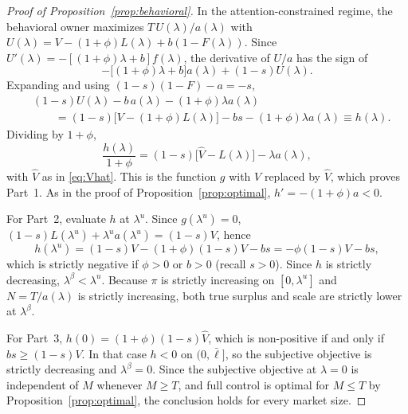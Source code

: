 \documentclass[11pt,a4paper]{article}
\theoremstyle{plain}
\newcommand{\lbar}{\bar{\ell}}
\begin{document}
\begin{proof}[Proof of Proposition~\ref{prop:behavioral}]
In the attention-constrained regime, the behavioral owner maximizes $T \, U(\lambda)/a(\lambda)$ with $U(\lambda) = V - (1 + \phi)L(\lambda) + b(1 - F(\lambda))$. Since $U'(\lambda) = -[(1+\phi)\lambda + b] f(\lambda)$, the derivative of $U/a$ has the sign of
\[
  -\big[(1+\phi)\lambda + b\big] a(\lambda) + (1 - s) U(\lambda).
\]
Expanding and using $(1-s)(1 - F) - a = -s$,
\begin{align*}
  &(1-s)U(\lambda) - b\,a(\lambda) - (1+\phi)\lambda a(\lambda) \\
  &\qquad = (1 - s)\big[V - (1+\phi)L(\lambda)\big] - b s - (1 + \phi) \lambda a(\lambda) \equiv h(\lambda).
\end{align*}
Dividing by $1 + \phi$,
\[
  \frac{h(\lambda)}{1+\phi} = (1 - s)\big[\hat V - L(\lambda)\big] - \lambda a(\lambda),
\]
with $\hat V$ as in \eqref{eq:Vhat}. This is the function $g$ with $V$ replaced by $\hat V$, which proves Part~1. As in the proof of Proposition~\ref{prop:optimal}, $h' = -(1+\phi)a < 0$.

For Part~2, evaluate $h$ at $\lambda^u$. Since $g(\lambda^u) = 0$, $(1-s)L(\lambda^u) + \lambda^u a(\lambda^u) = (1-s)V$, hence
\[
  h(\lambda^u) = (1-s)V - (1+\phi)(1-s)V - bs = -\phi(1-s)V - bs,
\]
which is strictly negative if $\phi > 0$ or $b > 0$ (recall $s > 0$). Since $h$ is strictly decreasing, $\lambda^\beta < \lambda^u$. Because $\pi$ is strictly increasing on $[0, \lambda^u]$ and $N = T/a(\lambda)$ is strictly increasing, both true surplus and scale are strictly lower at $\lambda^\beta$.

For Part~3, $h(0) = (1+\phi)(1-s)\hat V$, which is non-positive if and only if $bs \ge (1-s)V$. In that case $h < 0$ on $(0, \lbar]$, so the subjective objective is strictly decreasing and $\lambda^\beta = 0$. Since the subjective objective at $\lambda = 0$ is independent of $M$ whenever $M \ge T$, and full control is optimal for $M \le T$ by Proposition~\ref{prop:optimal}, the conclusion holds for every market size.


\end{proof}
\end{document}
